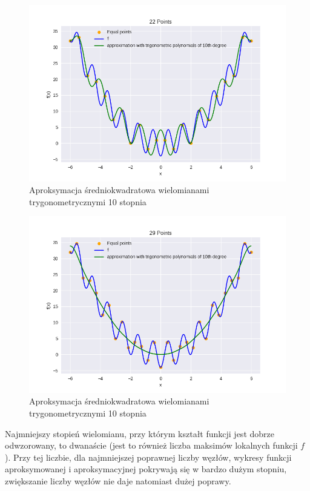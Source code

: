 \documentclass{article}
\begin{document}
\begin{figure}[H]
    \centering
    \includegraphics[width=\textwidth]{img/tripoly_10_22.png}
    \caption{Aproksymacja średniokwadratowa wielomianami trygonometrycznymi 10 stopnia}
\end{figure}

\begin{figure}[H]
    \centering
    \includegraphics[width=\textwidth]{img/tripoly_10_29.png}
    \caption{Aproksymacja średniokwadratowa wielomianami trygonometrycznymi 10 stopnia}
\end{figure}

Najmniejszy stopień wielomianu, przy którym kształt funkcji jest dobrze odwzorowany, to dwanaście (jest to również liczba maksimów lokalnych funkcji $f$). 
Przy tej liczbie, dla najmniejszej poprawnej liczby węzłów, wykresy funkcji aproksymowanej i aproksymacyjnej pokrywają się w bardzo dużym stopniu, 
zwiększanie liczby węzłów nie daje natomiast dużej poprawy.
\end{document}
